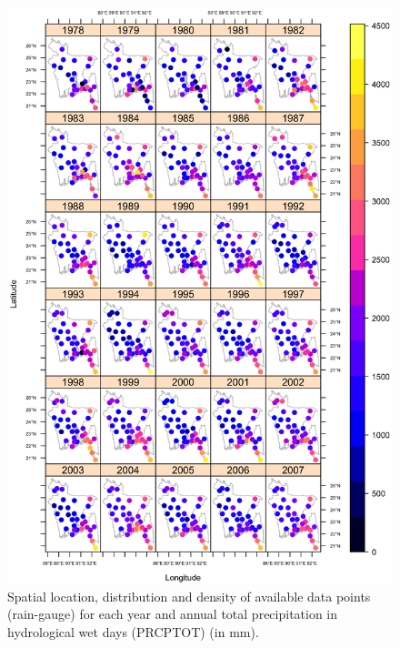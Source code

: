 \begin{figure}[h!]
  \centering
  \includegraphics[width=\textwidth]{Figures/Fig_B_1_b.png}
  \caption{Spatial location, distribution and density of available data points (rain-gauge) for each year and annual total precipitation in hydrological wet days (PRCPTOT) (in mm).}
  \label{Fig_B_1_b}
\end{figure}

\clearpage

\setlength{\LTcapwidth}{\linewidth}

